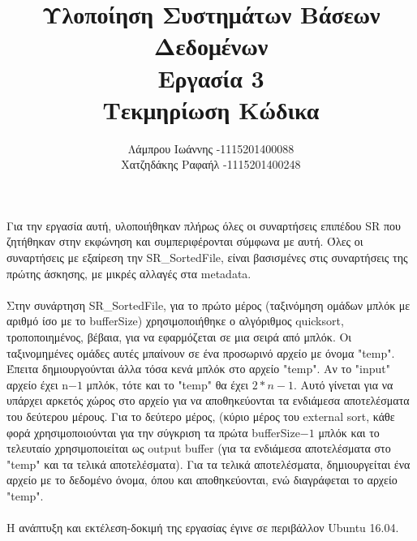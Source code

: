 \documentclass{article}
\begin{document}
\title{\vspace{-3.5cm}\textbf{Υλοποίηση Συστημάτων Βάσεων Δεδομένων}\\Εργασία 3\\ Τεκμηρίωση Κώδικα}
\author{Λάμπρου Ιωάννης -\textlatin{1115201400088}\\ Χατζηδάκης Ραφαήλ -\textlatin{1115201400248}}

\maketitle
\paragraph{}
Για την εργασία αυτή, υλοποιήθηκαν πλήρως όλες οι συναρτήσεις επιπέδου SR που ζητήθηκαν στην εκφώνηση και συμπεριφέρονται σύμφωνα με αυτή. Όλες οι συναρτήσεις με εξαίρεση την \textlatin{SR\_SortedFile}, είναι βασισμένες στις συναρτήσεις της πρώτης άσκησης, με μικρές αλλαγές στα \textlatin{metadata}. \\ 
\paragraph{}
Στην συνάρτηση \textlatin{SR\_SortedFile}, για το πρώτο μέρος (ταξινόμηση ομάδων μπλόκ με αριθμό ίσο με το \textlatin{bufferSize}) χρησιμοποιήθηκε ο αλγόριθμος \textlatin{quicksort}, τροποποιημένος, βέβαια, για να εφαρμόζεται σε μια σειρά από μπλόκ. Οι ταξινομημένες ομάδες αυτές μπαίνουν σε ένα προσωρινό αρχείο με όνομα \textlatin{"temp"}. Έπειτα δημιουργούνται άλλα τόσα κενά μπλόκ στο αρχείο \textlatin{"temp"}. Αν το \textlatin{"input"} αρχείο έχει \textlatin{n}$-1$
μπλόκ, τότε και το \textlatin{"temp"} θα έχει $2*n-1$. Αυτό γίνεται για να υπάρχει αρκετός χώρος στο αρχείο για να αποθηκεύονται τα ενδιάμεσα αποτελέσματα του δεύτερου μέρους.
Για το δεύτερο μέρος, (κύριο μέρος του \textlatin{external sort}, κάθε φορά χρησιμοποιούνται για την σύγκριση τα πρώτα \textlatin{bufferSize}$-1$ μπλόκ και το τελευταίο χρησιμοποιείται ως \textlatin{output buffer} (για τα ενδιάμεσα αποτελέσματα στο \textlatin{"temp"} και τα τελικά αποτελέσματα).
Για τα τελικά αποτελέσματα, δημιουργείται ένα αρχείο με το δεδομένο όνομα, όπου και αποθηκεύονται, ενώ διαγράφεται το αρχείο \textlatin{"temp"}.

\paragraph{}
Η ανάπτυξη και εκτέλεση-δοκιμή της εργασίας έγινε σε περιβάλλον \textlatin{Ubuntu 16.04}.
\end{document}
